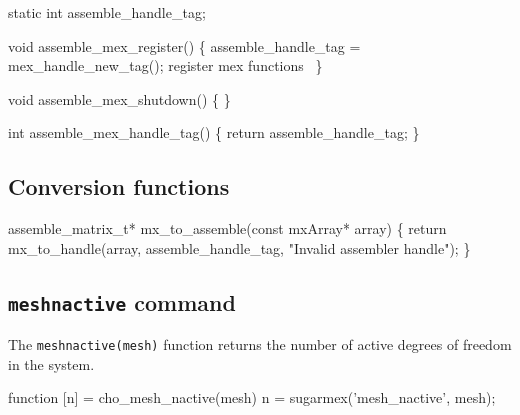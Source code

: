 \nwenddocs{}\endmoddef
static int assemble_handle_tag;

\nwendcode{}\nwdocspar

\nwenddocs{}\endmoddef
void assemble_mex_register()
\{
    assemble_handle_tag = mex_handle_new_tag();
    \LA{}register mex functions~{\nwtagstyle{}}\RA{}
\}

void assemble_mex_shutdown()
\{
\}

int assemble_mex_handle_tag()
\{
    return assemble_handle_tag;
\}

\nwendcode{}\nwdocspar


\subsection{Conversion functions}

\nwenddocs{}\plusendmoddef
assemble_matrix_t* mx_to_assemble(const mxArray* array)
\{
    return mx_to_handle(array, assemble_handle_tag, 
                        "Invalid assembler handle");
\}

\nwendcode{}\nwdocspar


\subsection{{\tt{}mesh{}nactive} command}

The {\tt{}mesh{}nactive(mesh)} function returns the number of active
degrees of freedom in the system.

\nwenddocs{}\endmoddef
function [n] = cho_mesh_nactive(mesh)
n = sugarmex('mesh_nactive', mesh);
\nwendcode{}\nwdocspar

